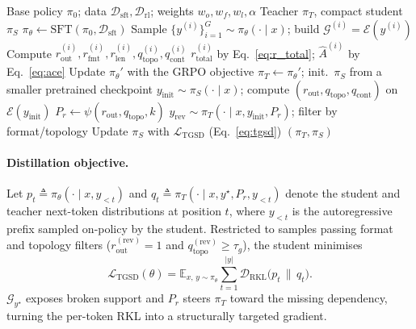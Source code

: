 \begin{algorithm}[t]
\small
\caption{\framework Training Pipeline}
\label{alg:topoprm}
\begin{algorithmic}[1]
\Require Base policy $\pi_0$; data $\mathcal{D}_{\mathrm{sft}},\mathcal{D}_{\mathrm{rl}}$; weights $w_o,w_f,w_l,\alpha$
\Ensure Teacher $\pi_T$, compact student $\pi_S$
\State $\pi_\theta\!\leftarrow\!\mathrm{SFT}(\pi_0,\mathcal{D}_{\mathrm{sft}})$ 
 
  \State Sample $\{y^{(i)}\}_{i=1}^{G}\!\sim\!\pi_\theta(\cdot\!\mid\!x)$; build $\mathcal{G}^{(i)}\!=\!\mathcal{E}(y^{(i)})$
  \State Compute $r_{\mathrm{out}}^{(i)},r_{\mathrm{fmt}}^{(i)},r_{\mathrm{len}}^{(i)},q_{\mathrm{topo}}^{(i)},q_{\mathrm{cont}}^{(i)}$
  \State $r_{\mathrm{total}}^{(i)}$ by Eq.~\ref{eq:r_total}; $\widehat{A}^{(i)}$ by Eq.~\ref{eq:ace}
  \State Update $\pi_\theta'$ with the GRPO objective
\EndFor
\State $\pi_T\!\leftarrow\!\pi_\theta'$; init.\ $\pi_S$ from a smaller pretrained checkpoint
 
  \State $y_{\mathrm{init}}\!\sim\!\pi_S(\cdot\!\mid\!x)$; compute $(r_{\mathrm{out}},q_{\mathrm{topo}},q_{\mathrm{cont}})$ on $\mathcal{E}(y_{\mathrm{init}})$
  \State $P_r\!\leftarrow\!\psi(r_{\mathrm{out}},q_{\mathrm{topo}},k)$
  \State $y_{\mathrm{rev}}\!\sim\!\pi_T(\cdot\!\mid\!x,y_{\mathrm{init}},P_r)$; filter by format/topology
  \State Update $\pi_S$ with $\mathcal{L}_{\mathrm{TGSD}}$ (Eq.~\ref{eq:tgsd})
\EndFor
\State \Return $(\pi_T,\pi_S)$
\end{algorithmic}
\end{algorithm}

\paragraph{Distillation objective.}
Let $p_t \!\triangleq\! \pi_\theta(\cdot\!\mid\!x,y_{<t})$ and $q_t \!\triangleq\! \pi_T(\cdot\!\mid\!x,y^{\star},P_r,y_{<t})$ denote the student and teacher next-token distributions at position $t$, where $y_{<t}$ is the autoregressive prefix sampled on-policy by the student. Restricted to samples passing format and topology filters ($r_{\mathrm{out}}^{(\mathrm{rev})}\!=\!1$ and $q_{\mathrm{topo}}^{(\mathrm{rev})}\!\ge\!\tau_g$), the student minimises
\begin{equation}
\label{eq:tgsd}
\mathcal{L}_{\mathrm{TGSD}}(\theta)=
\mathbb{E}_{x,\,y\sim\pi_\theta}\!\sum_{t=1}^{|y|}
\mathcal{D}_{\mathrm{RKL}}\!\bigl(p_t\,\|\,q_t\bigr).
\end{equation}
$\mathcal{G}_{y^{\star}}$ exposes broken support and $P_r$ steers $\pi_T$ toward the missing dependency, turning the per-token RKL into a structurally targeted gradient.

